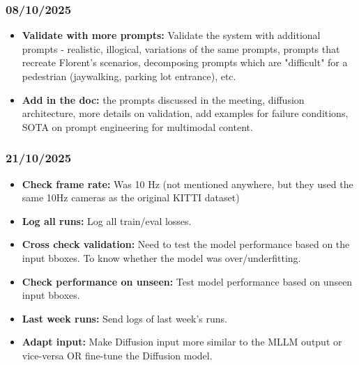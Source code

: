 \documentclass{article}
\begin{document}
\subsubsection{08/10/2025}    

\begin{itemize}

    \item \textbf{Validate with more prompts:} Validate the system with additional prompts - realistic, illogical, variations of the same prompts, prompts that recreate Florent's scenarios, decomposing prompts which are "difficult" for a pedestrian (jaywalking, parking lot entrance), etc.

    \item \textbf{Add in the doc:} the prompts discussed in the meeting, diffusion architecture, more details on validation, add examples for failure conditions, SOTA on prompt engineering for multimodal content.
    
\end{itemize}

\subsubsection{21/10/2025}    

\begin{itemize}

    \item \textbf{Check frame rate:} Was 10 Hz (not mentioned anywhere, but they used the same 10Hz cameras as the original KITTI dataset)

    \item \textbf{Log all runs:} Log all train/eval losses.

    \item \textbf{Cross check validation:} Need to test the model performance based on the input bboxes. To know whether the model was over/underfitting.
    
    \item \textbf{Check performance on unseen:} Test model performance based on unseen input bboxes.
    
    \item \textbf{Last week runs:} Send logs of last week's runs.
            
    \item \textbf{Adapt input:} Make Diffusion input more similar to the MLLM output or vice-versa OR fine-tune the Diffusion model.
    
\end{itemize}
\end{document}
